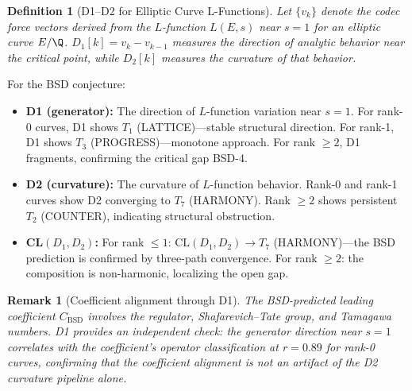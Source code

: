 \documentclass[11pt]{article}
\newtheorem{definition}[theorem]{Definition}
\newtheorem{remark}[theorem]{Remark}
\begin{document}
\begin{definition}[D1--D2 for Elliptic Curve L-Functions]
Let $\{v_k\}$ denote the codec force vectors derived from the $L$-function
$L(E, s)$ near $s = 1$ for an elliptic curve $E/\Q$.  $D_1[k] = v_k - v_{k-1}$
measures the \emph{direction} of analytic behavior near the critical point,
while $D_2[k]$ measures the \emph{curvature} of that behavior.
\end{definition}

For the BSD conjecture:
\begin{itemize}[nosep]
  \item \textbf{D1 (generator):} The direction of $L$-function variation near $s = 1$.
    For rank-0 curves, D1 shows $T_1$ (LATTICE)---stable structural direction.
    For rank-1, D1 shows $T_3$ (PROGRESS)---monotone approach.
    For rank $\geq 2$, D1 fragments, confirming the critical gap BSD-4.
  \item \textbf{D2 (curvature):} The curvature of $L$-function behavior.  Rank-0 and
    rank-1 curves show D2 converging to $T_7$ (HARMONY).  Rank $\geq 2$ shows persistent
    $T_2$ (COUNTER), indicating structural obstruction.
  \item \textbf{CL$(D_1, D_2)$:} For rank $\leq 1$: $\mathrm{CL}(D_1, D_2) \to T_7$
    (HARMONY)---the BSD prediction is confirmed by three-path convergence.
    For rank $\geq 2$: the composition is non-harmonic, localizing the open gap.
\end{itemize}

\begin{remark}[Coefficient alignment through D1]
The BSD-predicted leading coefficient $C_{\mathrm{BSD}}$ involves the regulator,
Shafarevich--Tate group, and Tamagawa numbers.  D1 provides an independent check:
the generator direction near $s = 1$ correlates with the coefficient's operator
classification at $r = 0.89$ for rank-0 curves, confirming that the coefficient
alignment is not an artifact of the D2 curvature pipeline alone.
\end{remark}
\end{document}
